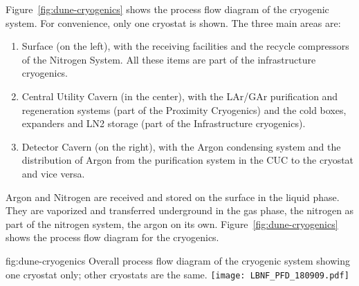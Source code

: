 Figure~\ref{fig:dune-cryogenics} shows the process flow diagram of the
 cryogenic system. For convenience, only one cryostat is shown. The three main areas are:
\begin{enumerate}
  \item Surface (on the left), with the receiving facilities and the
    recycle compressors of the Nitrogen System.  All these items are
    part of the infrastructure cryogenics.
  \item Central Utility Cavern (in the center), with the LAr/GAr
    purification and regeneration systems (part of the Proximity
    Cryogenics) and the cold boxes, expanders and LN2 storage (part of
    the Infrastructure cryogenics).
\item Detector Cavern (on the right), with the Argon condensing system
  and the distribution of Argon from the purification system in the
  CUC to the cryostat and vice versa.
\end{enumerate}

Argon and Nitrogen are received and stored on the surface in the
liquid phase.  They are vaporized and transferred underground in the
gas phase, the nitrogen as part of the nitrogen system, the argon on
its own. Figure~\ref{fig:dune-cryogenics} shows the process flow
diagram for the cryogenics.
\begin{dunefigure}{fig:dune-cryogenics}
  {Overall process flow diagram of the cryogenic system showing one
    cryostat only; other cryostats are the same.}
  \texttt{[image: LBNF\_PFD\_180909.pdf]}
\end{dunefigure}


